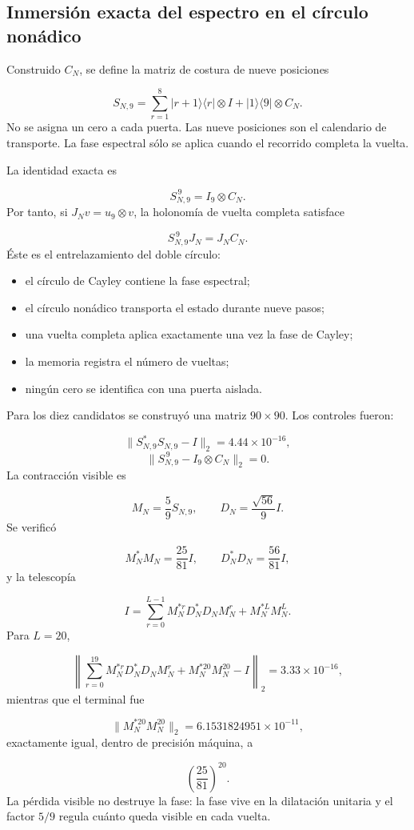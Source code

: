 \subsection{Inmersión exacta del espectro en el círculo nonádico}
Construido \(C_N\), se define la matriz de costura de nueve posiciones\par
\[
S_{N,9}
=
\sum_{r=1}^{8}
|r+1\rangle\langle r|\otimes I
+
|1\rangle\langle9|\otimes C_N.
\]
No se asigna un cero a cada puerta. Las nueve posiciones son el calendario de transporte. La fase espectral sólo se aplica cuando el recorrido completa la vuelta.\par
La identidad exacta es\par
\[
S_{N,9}^{\,9}=I_9\otimes C_N.
\]
Por tanto, si \(J_Nv=u_9\otimes v\), la holonomía de vuelta completa satisface\par
\[
S_{N,9}^{\,9}J_N=J_NC_N.
\]
Éste es el entrelazamiento del doble círculo:\par
\begin{itemize}
\item el círculo de Cayley contiene la fase espectral;
\item el círculo nonádico transporta el estado durante nueve pasos;
\item una vuelta completa aplica exactamente una vez la fase de Cayley;
\item la memoria registra el número de vueltas;
\item ningún cero se identifica con una puerta aislada.
\end{itemize}
Para los diez candidatos se construyó una matriz \(90\times90\). Los controles fueron:\par
\[
\|S_{N,9}^*S_{N,9}-I\|_2
=
4.44\times10^{-16},
\]
\[
\|S_{N,9}^{\,9}-I_9\otimes C_N\|_2=0.
\]
La contracción visible es\par
\[
M_N=\frac59S_{N,9},
\qquad
D_N=\frac{\sqrt{56}}9I.
\]
Se verificó\par
\[
M_N^*M_N=\frac{25}{81}I,
\qquad
D_N^*D_N=\frac{56}{81}I,
\]
y la telescopía\par
\[
I=
\sum_{r=0}^{L-1}
M_N^{*r}D_N^*D_NM_N^r
+
M_N^{*L}M_N^L.
\]
Para \(L=20\),\par
\[
\left\|
\sum_{r=0}^{19}M_N^{*r}D_N^*D_NM_N^r
+
M_N^{*20}M_N^{20}
-I
\right\|_2
=
3.33\times10^{-16},
\]
mientras que el terminal fue\par
\[
\|M_N^{*20}M_N^{20}\|_2
=
6.1531824951\times10^{-11},
\]
exactamente igual, dentro de precisión máquina, a\par
\[
\left(\frac{25}{81}\right)^{20}.
\]
La pérdida visible no destruye la fase: la fase vive en la dilatación unitaria y el factor \(5/9\) regula cuánto queda visible en cada vuelta.\par
{}
